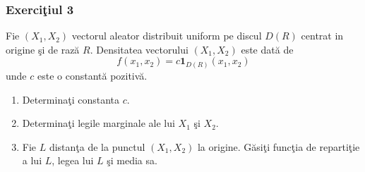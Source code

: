 \documentclass[]{article}
\def\1{{\mathbf 1}}
\begin{document}
\subsubsection{\texorpdfstring{Exerci\c tiul
3}{Exerciiul 3}}\label{exerciiul-3}

Fie \((X_1,X_2)\) vectorul aleator distribuit uniform pe discul \(D(R)\)
centrat in origine \c si de raz\u a \(R\). Densitatea vectorului
\((X_1,X_2)\) este dat\u a de \[
  f(x_1,x_2) = c\1_{D(R)}(x_1,x_2)
\] unde \(c\) este o constant\u a pozitiv\u a.

\begin{enumerate}
\def\labelenumi{\arabic{enumi}.}
\item
  Determina\c ti constanta \(c\).
\item
  Determina\c ti legile marginale ale lui \(X_1\) \c si \(X_2\).
\item
  Fie \(L\) distan\c ta de la punctul \((X_1,X_2)\) la origine.
  G\u asi\c ti func\c tia de reparti\c tie a lui \(L\), legea lui \(L\)
  \c si media sa.
\end{enumerate}
\end{document}
